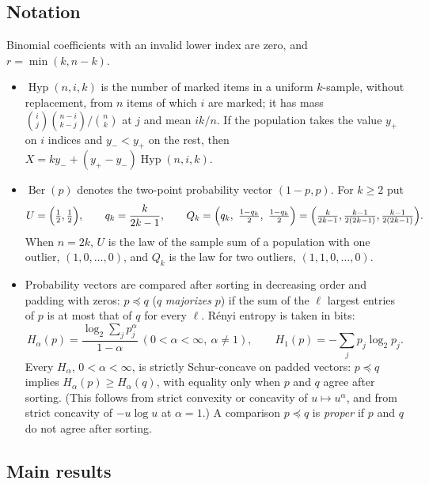 \documentclass[11pt]{article}
\theoremstyle{remark}
\newcommand{\Hyp}{\operatorname{Hyp}}
\newcommand{\Ber}{\operatorname{Ber}}
\begin{document}
\subsection{Notation}\label{subsec:notation}
Binomial coefficients with an invalid lower index are zero, and
\(r=\min(k,n-k)\).
\begin{itemize}
\item \(\Hyp(n,i,k)\) is the number of marked items in a uniform \(k\)-sample,
without replacement, from \(n\) items of which \(i\) are marked; it has mass
\(\binom ij\binom{n-i}{k-j}/\binom nk\) at \(j\) and mean \(ik/n\). If the
population takes the value \(y_+\) on \(i\) indices and \(y_-<y_+\) on the
rest, then \(X=ky_-+(y_+-y_-)\Hyp(n,i,k)\).
\item \(\Ber(p)\) denotes the two-point probability vector \((1-p,p)\). For
\(k\ge2\) put
\[
 U=\Bigl(\tfrac12,\tfrac12\Bigr),\qquad
 q_k=\frac{k}{2k-1},\qquad
 Q_k=\Bigl(q_k,\ \tfrac{1-q_k}2,\ \tfrac{1-q_k}2\Bigr)
 =\Bigl(\tfrac{k}{2k-1},\tfrac{k-1}{2(2k-1)},\tfrac{k-1}{2(2k-1)}\Bigr).
\]
When \(n=2k\), \(U\) is the law of the sample sum of a population with one
outlier, \((1,0,\ldots,0)\), and \(Q_k\) is the law for two outliers,
\((1,1,0,\ldots,0)\).
\item Probability vectors are compared after sorting in decreasing order and
padding with zeros: \(p\preceq q\) (\(q\) \emph{majorizes} \(p\)) if the sum
of the \(\ell\) largest entries of \(p\) is at most that of \(q\) for every
\(\ell\). R\'enyi entropy is taken in bits:
\[
 H_\alpha(p)=\frac{\log_2\sum_jp_j^\alpha}{1-\alpha}\ (0<\alpha<\infty,\
 \alpha\ne1),\qquad H_1(p)=-\sum_jp_j\log_2p_j .
\]
Every \(H_\alpha\), \(0<\alpha<\infty\), is strictly Schur-concave on padded
vectors: \(p\preceq q\) implies \(H_\alpha(p)\ge H_\alpha(q)\), with equality
only when \(p\) and \(q\) agree after sorting. (This follows from strict
convexity or concavity of \(u\mapsto u^\alpha\), and from strict concavity of
\(-u\log u\) at \(\alpha=1\).) A comparison \(p\preceq q\) is \emph{proper} if
\(p\) and \(q\) do not agree after sorting.
\end{itemize}

\subsection{Main results}
\end{document}
